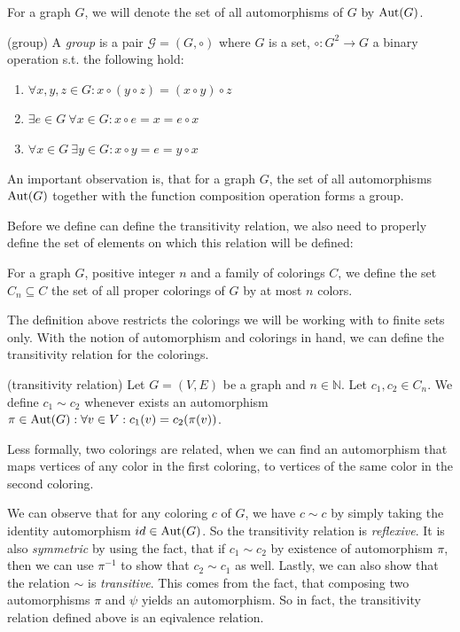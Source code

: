 For a graph $G$, we will denote the set of all automorphisms of $G$ by $\operatorname{Aut}(G)$.

\begin{defn}(group)
    A \emph{group} is a pair $\mathcal{G}=(G,\circ)$ where $G$ is a set, $\circ:G^2 \rightarrow G$ a binary operation s.t. the following hold:
    \begin{enumerate}
        \item $\forall x,y,z \in G : x \circ (y \circ z) = ( x \circ y ) \circ z$
        \item $\exists e \in G \ \forall x \in G :x \circ e = x = e \circ x$
        \item $ \forall x \in G \ \exists y \in G : x \circ y = e = y \circ x$
    \end{enumerate}
\end{defn}

An important observation is, that for a graph $G$, the set of all automorphisms $\operatorname{Aut}(G)$ together with the function composition operation forms a group. 

Before we define can define the transitivity relation, we also need to properly define the set of elements on which this relation will be defined:

\begin{defn}
    For a graph $G$, positive integer $n$ and a family of colorings $C$, we define the set $C_n \subseteq C$ the set of all proper colorings of $G$ by at most $n$ colors.
\end{defn}

The definition above restricts the colorings we will be working with to finite sets only. With the notion of automorphism and colorings in hand, we can define the transitivity relation for the colorings.

\begin{defn}(transitivity relation)
        Let $G=(V,E)$ be a graph and $n\in \mathbb{N}$. Let $c_1,c_2 \in C_n$. We define $c_1 \sim c_2$ whenever exists an automorphism $\pi \in \operatorname{Aut}(G) : \forall v \in V : c_1(v)=c_2(\pi(v))$.
\end{defn}

Less formally, two colorings are related, when we can find an automorphism that maps vertices of any color in the first coloring, to vertices of the same color in the second coloring. 

We can observe that for any coloring $c$ of $G$, we have $c \sim c$ by simply taking the identity automorphism $id \in \operatorname{Aut}(G)$. So the transitivity relation is \textit{reflexive}. It is also \textit{symmetric} by using the fact, that if $c_1 \sim c_2$ by existence of automorphism $\pi$, then we can use $\pi^{-1}$ to show that $c_2 \sim c_1$ as well. Lastly, we can also show that the relation $\sim$ is \textit{transitive}. This comes from the fact, that composing two automorphisms $\pi$ and $\psi$ yields an automorphism. So in fact, the transitivity relation defined above is an eqivalence relation.

